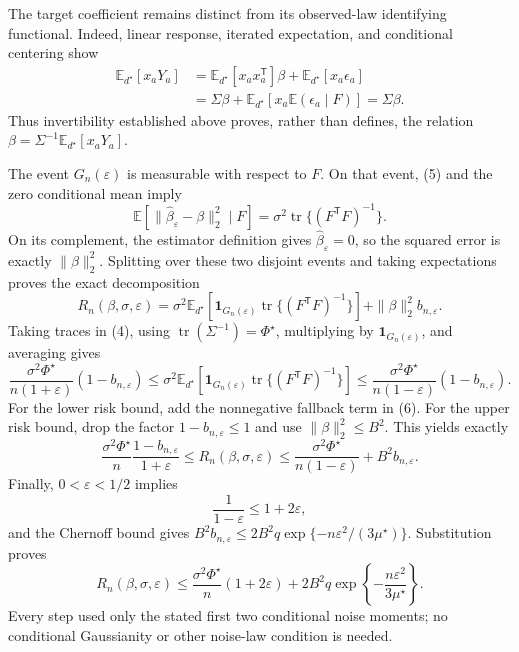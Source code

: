 The target coefficient remains distinct from its observed-law identifying functional.  Indeed, linear response, iterated expectation, and conditional centering show
\[
\begin{aligned}
 \mathbb E_{d^\star}[x_aY_a]
 &=\mathbb E_{d^\star}[x_ax_a^{\mathsf T}]\beta
   +\mathbb E_{d^\star}[x_a\epsilon_a]\\
 &=\Sigma\beta
   +\mathbb E_{d^\star}\!\left[x_a\mathbb E(\epsilon_a\mid F)\right]
 =\Sigma\beta.
\end{aligned}
\]
Thus invertibility established above proves, rather than defines, the relation
\(\beta=\Sigma^{-1}\mathbb E_{d^\star}[x_aY_a]\).

The event \(G_n(\varepsilon)\) is measurable with respect to \(F\).  On that event, (5) and the zero conditional mean imply
\[
 \mathbb E\!\left[\|\widehat\beta_\varepsilon-\beta\|_2^2\mid F\right]
 =\sigma^2\operatorname{tr}\{(F^{\mathsf T}F)^{-1}\}.
\]
On its complement, the estimator definition gives \(\widehat\beta_\varepsilon=0\), so the squared error is exactly \(\|\beta\|_2^2\).  Splitting over these two disjoint events and taking expectations proves the exact decomposition
\[
 R_n(\beta,\sigma,\varepsilon)
 =\sigma^2\mathbb E_{d^\star}\!\left[
   \mathbf 1_{G_n(\varepsilon)}
   \operatorname{tr}\{(F^{\mathsf T}F)^{-1}\}\right]
 +\|\beta\|_2^2b_{n,\varepsilon}. \tag{6}
\]
Taking traces in (4), using
\(\operatorname{tr}(\Sigma^{-1})=\Phi^\star\), multiplying by
\(\mathbf 1_{G_n(\varepsilon)}\), and averaging gives
\[
 \frac{\sigma^2\Phi^\star}{n(1+\varepsilon)}(1-b_{n,\varepsilon})
 \le
 \sigma^2\mathbb E_{d^\star}\!\left[
   \mathbf 1_{G_n(\varepsilon)}
   \operatorname{tr}\{(F^{\mathsf T}F)^{-1}\}\right]
 \le
 \frac{\sigma^2\Phi^\star}{n(1-\varepsilon)}(1-b_{n,\varepsilon}).
\]
For the lower risk bound, add the nonnegative fallback term in (6).  For the upper risk bound, drop the factor \(1-b_{n,\varepsilon}\le1\) and use \(\|\beta\|_2^2\le B^2\).  This yields exactly
\[
 \frac{\sigma^2\Phi^\star}{n}\frac{1-b_{n,\varepsilon}}{1+\varepsilon}
 \le R_n(\beta,\sigma,\varepsilon)
 \le\frac{\sigma^2\Phi^\star}{n(1-\varepsilon)}+B^2b_{n,\varepsilon}.
\]
Finally, \(0<\varepsilon<1/2\) implies
\[
 \frac{1}{1-\varepsilon}\le1+2\varepsilon,
\]
and the Chernoff bound gives
\(B^2b_{n,\varepsilon}\le2B^2q\exp\{-n\varepsilon^2/(3\mu^\star)\}\).  Substitution proves
\[
 R_n(\beta,\sigma,\varepsilon)
 \le\frac{\sigma^2\Phi^\star}{n}(1+2\varepsilon)
 +2B^2q\exp\!\left\{-\frac{n\varepsilon^2}{3\mu^\star}\right\}.
\]
Every step used only the stated first two conditional noise moments; no conditional Gaussianity or other noise-law condition is needed.
